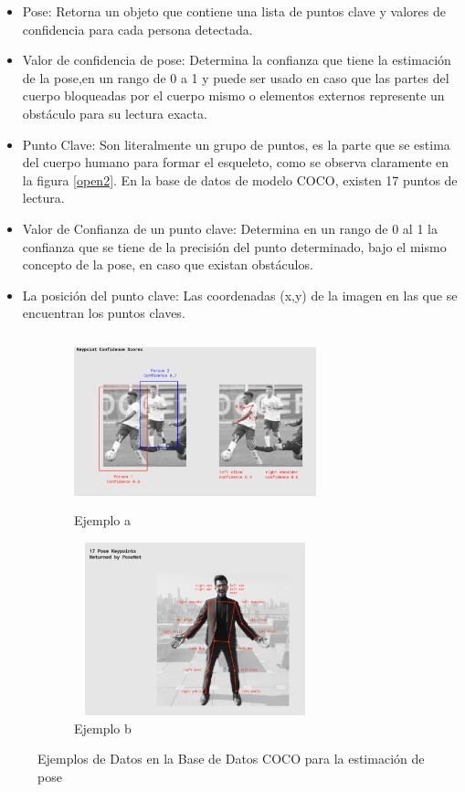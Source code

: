 \begin{itemize}
	\item Pose: Retorna un objeto que contiene una lista de puntos clave y valores de confidencia para cada persona detectada.
	\item Valor de confidencia de pose: Determina la confianza que tiene la estimación de la pose,en un rango de 0 a 1 y puede ser usado en caso que las partes del cuerpo bloqueadas por el cuerpo mismo o elementos externos represente un obstáculo para su lectura exacta.
	\item Punto Clave: Son literalmente un grupo de puntos, es la parte que se estima del cuerpo humano para formar el esqueleto, como se observa claramente en la figura \ref{open2}. En la base de datos de modelo COCO, existen 17 puntos de lectura.
	\item Valor de Confianza de un punto clave: Determina en un rango de 0 al 1 la confianza que se tiene de la precisión del punto determinado, bajo el mismo concepto de la pose, en caso que existan obstáculos.
	\item La posición del punto clave: Las coordenadas (x,y) de la imagen en las que se encuentran los puntos claves.
\end{itemize}

\begin{figure}[ht]
	\centering
	\begin{subfigure}{.5\textwidth}
		\centering
		\includegraphics[width=7cm,height=5cm,]{./Images/posenetcocoexample.png}
		\caption{Ejemplo a}
		\label{posenet1}
	\end{subfigure}%
	\begin{subfigure}{.5\textwidth}
		\centering
		\includegraphics[width=7cm,height=5cm]{./Images/posenetexample2.png}
		\caption{Ejemplo b}
		\label{posenet2}
	\end{subfigure}
	\caption{Ejemplos de Datos en la Base de Datos COCO para la estimación de pose}
	\label{exampleposenet}
\end{figure}



